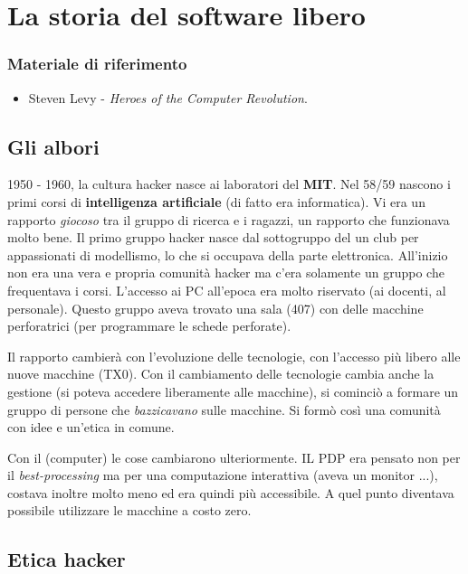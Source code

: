 \chapter{La storia del software libero}

\subsection*{Materiale di riferimento}

\begin{itemize}

\item Steven Levy - \textit{Heroes of the Computer Revolution}.

\end{itemize}

\section{Gli albori}

1950 - 1960, la cultura hacker nasce ai laboratori del \textbf{MIT}. Nel 58/59 nascono i primi corsi di \textbf{intelligenza artificiale} (di fatto era informatica). Vi era un rapporto \textit{giocoso} tra il gruppo di ricerca e i ragazzi, un rapporto che funzionava molto bene. Il primo gruppo hacker nasce dal sottogruppo del  un club per appassionati di modellismo, lo  che si occupava della parte elettronica. All'inizio non era una vera e propria comunità hacker ma c'era solamente un gruppo che frequentava i corsi. L'accesso ai PC all'epoca era molto riservato (ai docenti, al personale). Questo gruppo aveva trovato una sala (407) con delle macchine perforatrici (per programmare le schede perforate). 

Il rapporto cambierà con l'evoluzione delle tecnologie, con l'accesso più libero alle nuove macchine (TX0). Con il cambiamento delle tecnologie cambia anche la gestione (si poteva accedere liberamente alle macchine), si cominciò a formare un gruppo di persone che \textit{bazzicavano} sulle macchine. Si formò così una comunità con idee e un'etica in comune. 

Con il  (computer) le cose cambiarono ulteriormente. IL PDP era pensato non per il \textit{best-processing} ma per una computazione interattiva (aveva un monitor ...), costava inoltre molto meno ed era quindi più accessibile. A quel punto diventava possibile utilizzare le macchine a costo zero.

\section{Etica hacker}

